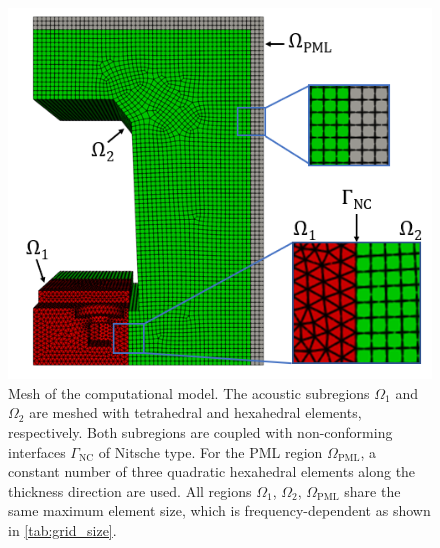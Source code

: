 \begin{figure}
	\centering
	\includegraphics{fig/chap4/mesh/Mesh_with_labels_small.png}
	\caption{Mesh of the computational model. The acoustic subregions $\Omega_1$ and $\Omega_2$ are meshed with tetrahedral and hexahedral elements, respectively. Both subregions are coupled with non-conforming interfaces $\Gamma_\text{NC}$ of Nitsche type. For the PML region $\Omega_{\text{PML}}$, a constant number of three quadratic hexahedral elements along the thickness direction are used. All regions $\Omega_1$, $\Omega_2$, $\Omega_{\text{PML}}$ share the same maximum element size, which is frequency-dependent as shown in \cref{tab:grid_size}.}
	\label{fig:mesh}
\end{figure}

